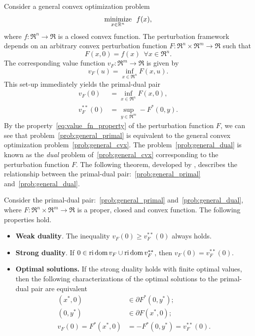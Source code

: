 Consider a general convex optimization problem
\begin{equation} \label{prob:general_cvx}
    \displaystyle\mathop{\hbox{\rm minimize}}_{x \in \mathbb{R}^n}\enspace f(x),
\end{equation}
where $f:\Re^n \to \Re$ is a closed convex function. The perturbation framework depends on an arbitrary convex perturbation function $F: \Re^n \times \Re^m \to \Re$ such that 
\begin{equation} \label{eq:value_fn_property}
    F(x, 0) = f(x) \enspace \forall x \in \Re^n.
\end{equation}
The corresponding value function $v_F : \Re^m \to \Re$ is given by 
\begin{equation}
    v_F(u) = \inf_{x \in \Re^n} F(x, u).
\end{equation}
This set-up immediately yields the primal-dual pair
\begin{align}
    v_F(0) &= \inf_{x \in \Re^n} F(x, 0), \label{prob:general_primal}\\
    v_F^{**}(0) &= \sup_{y \in \Re^m} -F^*(0, y). \label{prob:general_dual}
\end{align}
By the property~\eqref{eq:value_fn_property} of the perturbation function $F$, we can see that problem~\eqref{prob:general_primal} is equivalent to the general convex optimization problem~\eqref{prob:general_cvx}. The problem~\eqref{prob:general_dual} is known as the \emph{dual} problem of~\eqref{prob:general_cvx} corresponding to the perturbation function $F$. 
The following theorem, developed by \citet{rockafellar1998variational}, describes the relationship between the primal-dual pair:~\eqref{prob:general_primal} and~\eqref{prob:general_dual}. 

\begin{theorem} Consider the primal-dual pair:~\eqref{prob:general_primal} and~\eqref{prob:general_dual}, where $F: \Re^n \times \Re^m \to \Re$ is a proper, closed and convex function. The following properties hold. 
    \begin{itemize}
        \item \textbf{Weak duality}. The inequality $v_F(0) \geq v_F^{**}(0)$ always holds. 
        \item \textbf{Strong duality}. If $0 \in \operatorname{ri}\operatorname{dom} v_F \cup \operatorname{ri}\operatorname{dom} v_F^{**}$, then $v_F(0) = v_F^{**}(0)$. 
        \item \textbf{Optimal solutions.} If the strong duality holds with finite optimal values, then the following characterizations of the optimal solutions to the primal-dual pair are equivalent
            \begin{align}
                (x^*, 0) &\in \partial F^*(0,y^*); \\
                (0, y^*) &\in \partial F(x^*,0); \\
                v_F(0) = F^*(x^*, 0) &= -F^*(0,y^*) = v_F^{**}(0).
            \end{align}
    \end{itemize}
\end{theorem}

